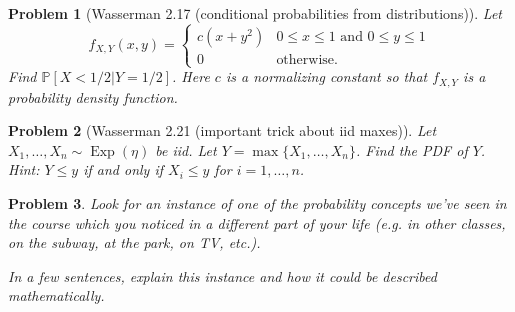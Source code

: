 \documentclass{article}
\newtheorem{problem}{Problem}
\newcommand{\PP}{\mathbb{P}}
\begin{document}
\begin{problem}[Wasserman 2.17 (conditional probabilities from distributions)]
Let
    \begin{equation*}
        f_{X,Y}(x,y) 
        = 
        \begin{cases}
            c(x+y^2) & 0\leq x\leq 1 \text{ and } 0\leq y \leq 1 \\
            0 & \text{otherwise.}
        \end{cases}
    \end{equation*}
    Find $\PP[X<1/2 | Y = 1/2]$. Here $c$ is a normalizing constant so that $f_{X,Y}$ is a probability density function.
\end{problem}

\begin{problem}[Wasserman 2.21 (important trick about iid maxes)]
    Let $X_1, \ldots, X_n\sim\operatorname{Exp}(\eta)$ be iid. Let $Y=\max\{X_1, \ldots, X_n\}$. Find the PDF of $Y$. Hint: $Y\leq y$ if and only if $X_i \leq y$ for $i=1,\ldots, n$.
\end{problem}

\begin{problem}
    Look for an instance of one of the probability concepts we've seen in the course which you noticed in a different part of your life (e.g. in other classes, on the subway, at the park, on TV, etc.).

    In a few sentences, explain this instance and how it could be described mathematically.
\end{problem}
\end{document}

